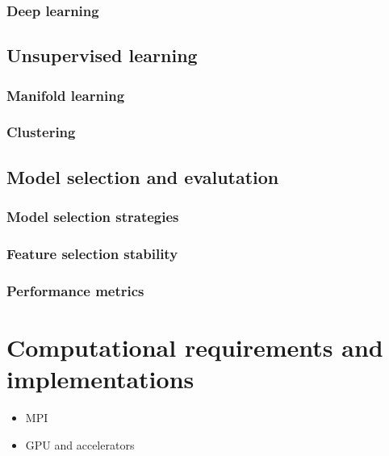     \subsubsection{Deep learning}


  \subsection{Unsupervised learning} \label{subsec:unsupervised_learning}
    \subsubsection{Manifold learning}
    \subsubsection{Clustering}


  \subsection{Model selection and evalutation} \label{subsec:model_selection}
    \subsubsection{Model selection strategies}
    \subsubsection{Feature selection stability}
    \subsubsection{Performance metrics}


\section{Computational requirements and implementations} \label{sec:implementation}
\begin{itemize}
  \item MPI
  \item GPU and accelerators
\end{itemize}
